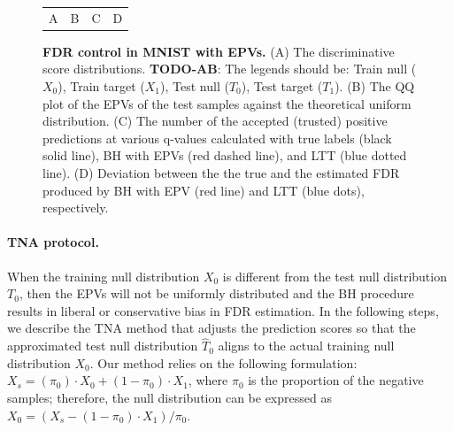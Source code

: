 \documentclass{article}
\newcommand{\todo}[2]{{\color{red} {\bf TODO-#1}: #2}}
\begin{document}
\begin{figure}
\begin{tabular}{cccc}
		A & B & C & D \\
	\end{tabular}
	\caption{{\bf FDR control in MNIST with EPVs. } (A) The discriminative score distributions. \todo{AB}{The legends should be: Train null ($X_0$), Train target ($X_1$), Test null ($T_0$), Test target ($T_1$).} (B) The QQ plot of the EPVs of the test samples against the theoretical uniform distribution. (C) The number of the accepted (trusted) positive predictions at various q-values calculated with true labels (black solid line), BH with EPVs (red dashed line), and LTT (blue dotted line). (D) Deviation between the the true and the estimated FDR produced by BH with EPV (red line) and LTT (blue dots), respectively.}
	\label{fig:binary}
\end{figure}
 
\paragraph{TNA protocol.} When the training null distribution $X_0$ is different from the test null distribution $T_0$, then the EPVs will not be uniformly distributed and the BH procedure results in liberal or conservative bias in FDR estimation. In the following steps, we describe the TNA method that adjusts the prediction scores so that the approximated test null distribution $\hat{T}_0$ aligns to the actual training null distribution $X_0$. Our method relies on the following formulation: $X_s = (\pi_0) \cdot X_0 + (1-\pi_0) \cdot X_1$, where $\pi_0$ is the proportion of the negative samples; therefore, the null distribution can be expressed as $X_0 = (X_s - (1-\pi_0) \cdot X_1)/\pi_0$.
\end{document}
